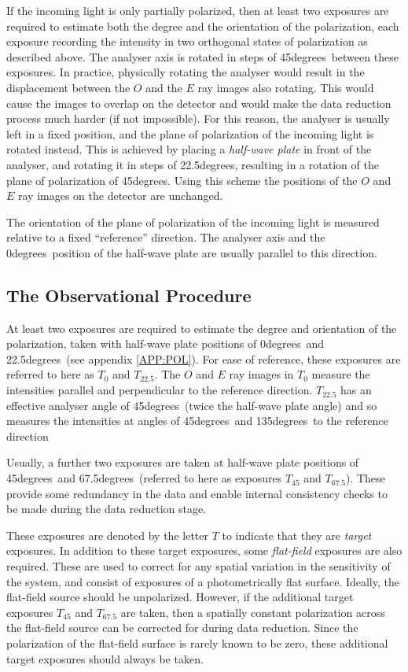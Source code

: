 \documentclass[twoside,11pt]{article}
\newcommand{\hyperref}[4]{#2\ref{#4}#3}
\newcommand{\xlabel}[1]{}
\renewcommand{\_}{\texttt{\symbol{95}}}
\newcommand{\dgs}{\hbox{$^\circ$}}
\renewcommand{\dgs}{degrees}
\begin{document}
If the incoming light is only partially polarized, then at least two
exposures are required to estimate both the degree and the orientation of
the polarization, each exposure recording the intensity in two orthogonal
states of polarization as described above. The analyser axis is rotated
in steps of 45\dgs\ between these exposures. In practice, physically rotating
the analyser would result in the displacement between the $O$ and
the $E$ ray images also rotating. This would cause the images to overlap
on the detector and would make the data reduction process much harder (if
not impossible). For this reason, the analyser is usually left in a fixed
position, and the plane of polarization of the incoming light is rotated
instead. This is achieved by placing a \emph{half-wave plate} in
front of the analyser, and rotating it in steps of 22.5\dgs, resulting in
a rotation of the plane of polarization of 45\dgs. Using this scheme the
positions of the $O$ and $E$ ray images on the detector are unchanged.

The orientation of the plane of polarization of the incoming light is
measured relative to a fixed ``reference'' direction. The analyser axis
and the 0\dgs\ position of the half-wave plate are usually parallel to
this direction. 

\subsection{\label{SEC:OBS}\xlabel{theobservationalprocedure}The Observational Procedure}
At least two exposures are required to estimate the degree and
orientation of the polarization, taken with half-wave plate positions of
0\dgs\ and 22.5\dgs\ (see \hyperref{here}{appendix }{}{APP:POL}). For ease
of reference, these exposures are referred to here as $T_{0}$ and
$T_{22.5}$. The $O$ and $E$ ray images in $T_{0}$ measure the intensities
parallel and perpendicular to the reference direction. $T_{22.5}$ has an
effective analyser angle of 45\dgs\ (twice the half-wave plate angle) and
so measures the intensities at angles of 45\dgs\ and 135\dgs\ to the
reference direction

Usually, a further two exposures are taken at half-wave plate positions
of 45\dgs\ and 67.5\dgs\ (referred to here as exposures $T_{45}$ and
$T_{67.5}$). These provide some redundancy in the data and enable
internal consistency checks to be made during the data reduction stage.

These exposures are denoted by the letter $T$ to indicate that they are
\emph{target} exposures. In addition to these target exposures, some {\em
flat-field} exposures are also required. These are used to correct for
any spatial variation in the sensitivity of the system, and consist of
exposures of a photometrically flat surface. Ideally, the flat-field
source should be unpolarized. However, if the additional target exposures
$T_{45}$ and $T_{67.5}$ are taken, then a spatially constant polarization 
across the flat-field source can be corrected for during data reduction.
Since the polarization of the flat-field surface is rarely known to be
zero, these additional target exposures should always be taken. 
\end{document}
